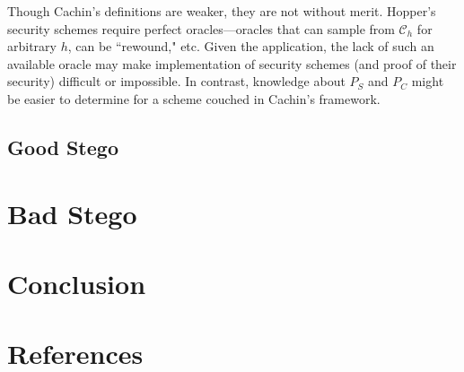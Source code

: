 \documentclass[11pt]{article}
\newcommand\channel{\ensuremath{\mathcal C}}
\begin{document}
Though Cachin's definitions are weaker, they are not without merit.
Hopper's security schemes require perfect oracles---oracles that can
sample from $\channel_h$ for arbitrary $h$, can be ``rewound," etc.
Given the application, the lack of such an available oracle may make
implementation of security schemes (and proof of their security)
difficult or impossible. In contrast, knowledge about $P_S$ and
$P_C$ might be easier to determine for a scheme couched in Cachin's
framework.

\subsection{Good Stego}

\section{Bad Stego}
\section{Conclusion}
\section{References}
\end{document}
